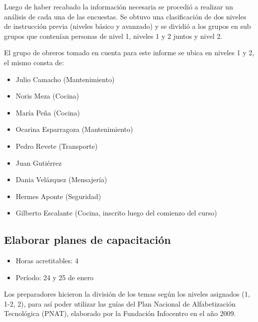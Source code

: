                 Luego de haber recabado la información necesaria se procedió a realizar un análisis de cada una de las encuestas. Se obtuvo una clasificación de dos niveles de instrucción previa (niveles básico y avanzado) y se dividió a los grupos en sub grupos que contenían personas de nivel 1, niveles 1 y 2 juntos y nivel 2.
                
                El grupo de obreros tomado en cuenta para este informe se ubica en niveles 1 y 2, el mismo consta de:
                \begin{itemize}
                    \item Julio Camacho (Mantenimiento)
                    \item Noris Meza (Cocina)
                    \item María Peña (Cocina)
                    \item Ocarina Esparragoza (Mantenimiento)
                    \item Pedro Revete (Transporte)
                    \item Juan Gutiérrez
                    \item Dania Velázquez (Mensajería)
                    \item Hermes Aponte (Seguridad)
                    \item Gilberto Escalante (Cocina, inscrito luego del comienzo del curso)
                \end{itemize}
                
             \subsection {Elaborar planes de capacitación}
             \begin{itemize}
                 \item Horas acretitables: 4
                 \item Período: 24 y 25 de enero
                \end{itemize}
                
                Los preparadores hicieron la división de los temas según los niveles asignados (1, 1-2, 2), para así poder utilizar las guías del Plan Nacional de Alfabetización Tecnológica (PNAT), elaborado por la Fundación Infocentro en el año 2009.
                

